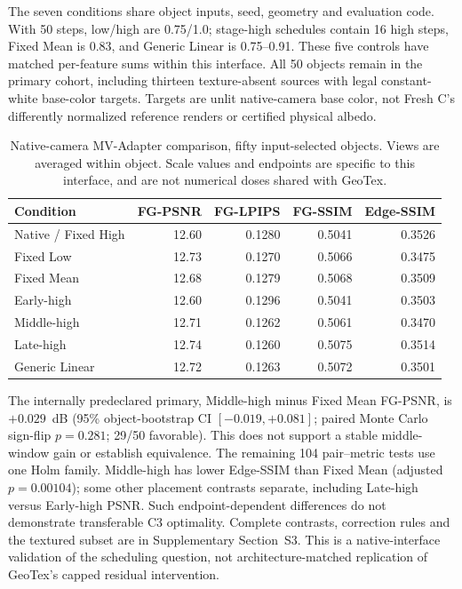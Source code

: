 \documentclass[times,twocolumn,final]{elsarticle}
\begin{document}
The seven conditions share object inputs, seed, geometry and evaluation code. With 50 steps, low/high are 0.75/1.0; stage-high schedules contain 16 high steps, Fixed Mean is 0.83, and Generic Linear is 0.75--0.91. These five controls have matched per-feature sums within this interface. All 50 objects remain in the primary cohort, including thirteen texture-absent sources with legal constant-white base-color targets. Targets are unlit native-camera base color, not Fresh C's differently normalized reference renders or certified physical albedo.

\begin{table}[ht]\centering\scriptsize
\caption{Native-camera MV-Adapter comparison, fifty input-selected objects. Views are averaged within object. Scale values and endpoints are specific to this interface, and are not numerical doses shared with GeoTex.}\label{tab:new-mva}
\begin{tabular}{lrrrr}
\toprule Condition & FG-PSNR & FG-LPIPS & FG-SSIM & Edge-SSIM \\
\midrule
Native / Fixed High & 12.60 & 0.1280 & 0.5041 & 0.3526 \\
Fixed Low & 12.73 & 0.1270 & 0.5066 & 0.3475 \\
Fixed Mean & 12.68 & 0.1279 & 0.5068 & 0.3509 \\
Early-high & 12.60 & 0.1296 & 0.5041 & 0.3503 \\
Middle-high & 12.71 & 0.1262 & 0.5061 & 0.3470 \\
Late-high & 12.74 & 0.1260 & 0.5075 & 0.3514 \\
Generic Linear & 12.72 & 0.1263 & 0.5072 & 0.3501 \\
\bottomrule\end{tabular}\end{table}

The internally predeclared primary, Middle-high minus Fixed Mean FG-PSNR, is $+0.029$~dB (95\% object-bootstrap CI $[-0.019,+0.081]$; paired Monte Carlo sign-flip $p=0.281$; 29/50 favorable). This does not support a stable middle-window gain or establish equivalence. The remaining 104 pair--metric tests use one Holm family. Middle-high has lower Edge-SSIM than Fixed Mean (adjusted $p=0.00104$); some other placement contrasts separate, including Late-high versus Early-high PSNR. Such endpoint-dependent differences do not demonstrate transferable C3 optimality. Complete contrasts, correction rules and the textured subset are in Supplementary Section~S3. This is a native-interface validation of the scheduling question, not architecture-matched replication of GeoTex's capped residual intervention.
\end{document}

